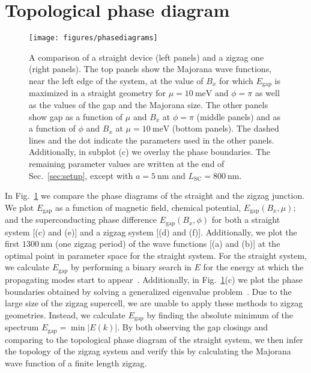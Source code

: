 \documentclass[english, twocolumn, 10pt, aps, superscriptaddress, floatfix, prb, citeautoscript]{revtex4-1}
\renewcommand{\comment}[2]{#2}
\begin{document}
\section{Topological phase diagram}

\begin{figure}[!htb]
\texttt{[image: figures/phasediagrams]}
\caption{A comparison of a straight device (left panels) and a zigzag one (right panels).
The top panels show the Majorana wave functions, near the left edge of the system, at the value of $B_x$ for which $E_\textrm{gap}$ is maximized in a straight geometry for $\mu=\SI{10}{\meV}$ and $\phi=\pi$ as well as the values of the gap and the Majorana size.
The other panels show gap as a function of $\mu$ and $B_x$ at $\phi=\pi$ (middle panels) and as a function of $\phi$ and $B_x$ at $\mu=\SI{10}{\meV}$ (bottom panels).
The dashed lines and the dot indicate the parameters used in the other panels.
Additionally, in subplot (c) we overlay the phase boundaries.
The remaining parameter values are written at the end of Sec.~\ref{sec:setup}, except with $a=\SI{5}{\nm}$ and $L_\textrm{SC}=\SI{800}{\nm}$.
\label{fig:phasediagrams}}
\end{figure}

\comment{We calculate the topological phase diagram using the gap size.}
In Fig.~\ref{fig:phasediagrams} we compare the phase diagrams of the straight and the zigzag junction.
We plot $E_\textrm{gap}$ as a function of magnetic field, chemical potential, $E_\textrm{gap}(B_x, \mu)$; and the superconducting phase difference $E_\textrm{gap}(B_x, \phi)$ for both a straight system [(c) and (e)] and a zigzag system [(d) and (f)].
Additionally, we plot the first $\SI{1300}{\nm}$ (one zigzag period) of the wave functions [(a) and (b)] at the optimal point in parameter space for the straight system.
For the straight system, we calculate $E_\textrm{gap}$ by performing a binary search in $E$ for the energy at which the propagating modes start to appear~\cite{Nijholt2015}.
Additionally, in Fig.~\ref{fig:phasediagrams}(c) we plot the phase boundaries obtained by solving a generalized eigenvalue problem~\cite{Nijholt2015}.
Due to the large size of the zigzag supercell, we are unable to apply these methods to zigzag geometries.
Instead, we calculate $E_\textrm{gap}$ by finding the absolute minimum of the spectrum $E_\textrm{gap}=\min{\left|E(k)\right|}$.
By both observing the gap closings and comparing to the topological phase diagram of the straight system, we then infer the topology of the zigzag system and verify this by calculating the Majorana wave function of a finite length zigzag.
\end{document}
